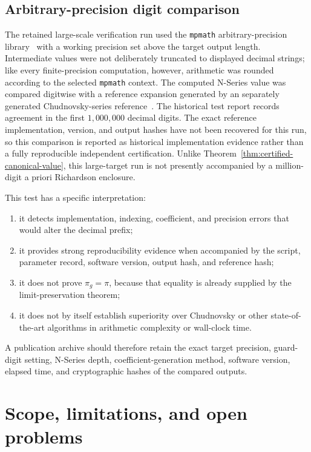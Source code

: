 \documentclass[12pt]{article}
\theoremstyle{definition}
\theoremstyle{remark}
\begin{document}
\subsection{Arbitrary-precision digit comparison}

The retained large-scale verification run used the \texttt{mpmath}
arbitrary-precision library~\cite{mpmath} with a working precision set above the
target output length.  Intermediate values were not deliberately truncated to displayed
decimal strings; like every finite-precision computation, however, arithmetic
was rounded according to the selected \texttt{mpmath} context.  The computed
N-Series value was compared digitwise with a reference expansion generated by an
separately generated Chudnovsky-series reference~\cite{chudnovsky}.
The historical test report records agreement in the first
$1{,}000{,}000$ decimal digits. The exact reference implementation, version,
and output hashes have not been recovered for this run, so this comparison
is reported as historical implementation evidence rather than a fully
reproducible independent certification.  Unlike Theorem~\ref{thm:certified-canonical-value}, this
large-target run is not presently accompanied by a million-digit a priori
Richardson enclosure.

This test has a specific interpretation:
\begin{enumerate}
  \item it detects implementation, indexing, coefficient, and precision errors
        that would alter the decimal prefix;
  \item it provides strong reproducibility evidence when accompanied by the
        script, parameter record, software version, output hash, and reference
        hash;
  \item it does not prove $\pi_g=\pi$, because that equality is already supplied
        by the limit-preservation theorem;
  \item it does not by itself establish superiority over Chudnovsky or other
        state-of-the-art algorithms in arithmetic complexity or wall-clock
        time.
\end{enumerate}

A publication archive should therefore retain the exact target precision,
guard-digit setting, N-Series depth, coefficient-generation method, software
version, elapsed time, and cryptographic hashes of the compared outputs.

\section{Scope, limitations, and open problems}
\end{document}
